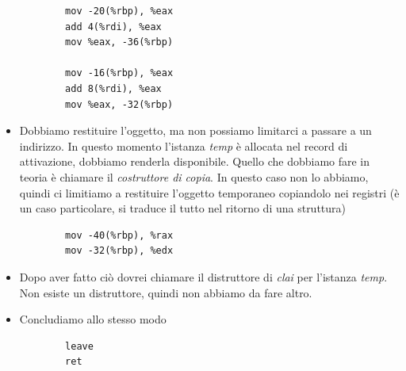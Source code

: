 \begin{itemize}
\begin{verbatim}
		mov -20(%rbp), %eax
		add 4(%rdi), %eax 
		mov %eax, -36(%rbp) 
		
		mov -16(%rbp), %eax 
		add 8(%rdi), %eax 
		mov %eax, -32(%rbp) 
	\end{verbatim}
	\item Dobbiamo restituire l'oggetto, ma non possiamo limitarci a passare a un indirizzo. In questo momento l'istanza \emph{temp} è allocata nel record di attivazione, dobbiamo renderla disponibile. Quello che dobbiamo fare in teoria è chiamare il \emph{costruttore di copia}. In questo caso non lo abbiamo, quindi ci limitiamo a restituire l'oggetto temporaneo copiandolo nei registri (è un caso particolare, si traduce il tutto nel ritorno di una struttura)
	\begin{verbatim}
		mov -40(%rbp), %rax
		mov -32(%rbp), %edx
	\end{verbatim}
	\item Dopo aver fatto ciò dovrei chiamare il distruttore di \emph{clai} per l'istanza \emph{temp}. Non esiste un distruttore, quindi non abbiamo da fare altro.
	\item Concludiamo allo stesso modo
	\begin{verbatim}
		leave
		ret
	\end{verbatim}
\end{itemize}

